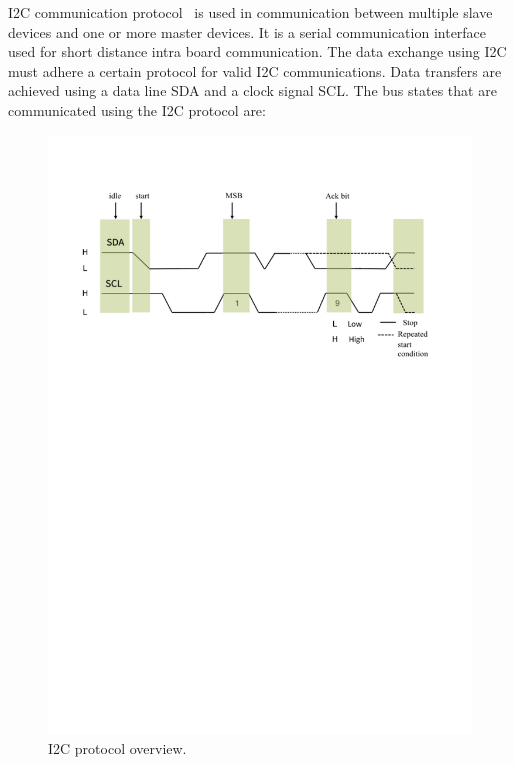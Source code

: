 \acrshort{I2C} communication protocol~\cite{NXP-I2C-UM10204-2014} is used in communication between multiple slave devices and one or more master devices.
It is a serial communication interface used for short distance intra board communication.
The data exchange using \acrshort{I2C} must adhere a certain protocol for valid I2C communications.
Data transfers are achieved using a data line \Gls{SDA} and a clock signal \Gls{SCL}.
The bus states that are communicated using the I2C protocol are:  

\begin{figure}[ht]
	\centering
	\includegraphics[trim=50 520 60 60, clip, width=140mm]{images/I2C(2).pdf}
	\caption{I2C protocol overview.}
	\label{fig:i2c_image}
\end{figure}


